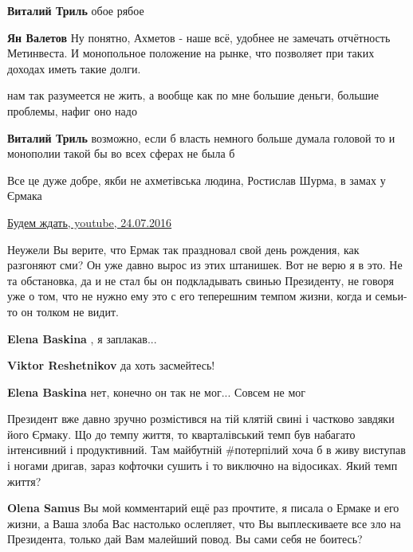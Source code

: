 \begin{itemize}
\begin{itemize} %
\textbf{Виталий Триль} обое рябое

\textbf{Ян Валетов} Ну понятно, Ахметов - наше всё, удобнее не замечать отчётность Метинвеста. И монопольное положение на рынке, что позволяет при таких доходах иметь такие долги.

нам так разумеется не жить, а вообще как по мне большие деньги, большие проблемы, нафиг оно надо

\textbf{Виталий Триль} возможно, если б власть немного больше думала головой то и монополии такой бы во всех сферах не была б
\end{itemize} %

Все це дуже добре, якби не ахметівська людина, Ростислав Шурма, в замах у Єрмака


\href{https://youtu.be/jBkSHQB0srI}{%
Будем ждать, youtube, 24.07.2016%
}


Неужели Вы верите, что Ермак так праздновал свой день рождения, как разгоняют
сми? Он уже давно вырос из этих штанишек. Вот не верю я в это. Не та
обстановка, да и не стал бы он подкладывать свинью Президенту, не говоря уже о
том, что не нужно ему это с его теперешним темпом жизни, когда и семьи-то он
толком не видит.

\begin{itemize} %
\textbf{Elena Baskina} , я заплакав...

\textbf{Viktor Reshetnikov} да хоть засмейтесь!

\textbf{Elena Baskina} нет, конечно он так не мог... Совсем не мог


Президент вже давно зручно розмістився на тій клятій свині і частково завдяки
його Єрмаку. Що до темпу життя, то кварталівський темп був набагато інтенсивний
і продуктивний. Там майбутній \#потерпілий хоча б в живу виступав і ногами
дригав, зараз кофточки сушить і то виключно на відосиках. Який темп життя?


\textbf{Olena Samus} Вы мой комментарий ещё раз прочтите, я писала о Ермаке и его жизни, а Ваша злоба Вас настолько ослепляет, что Вы выплескиваете все зло на Президента, только дай Вам малейший повод. Вы сами себя не боитесь?


\end{itemize}
\end{itemize}
